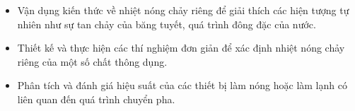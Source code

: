 \begin{emcothe}
\begin{itemize}
    \item Vận dụng kiến thức về nhiệt nóng chảy riêng để giải thích các hiện tượng tự nhiên như sự tan chảy của băng tuyết, quá trình đông đặc của nước.
    \item Thiết kế và thực hiện các thí nghiệm đơn giản để xác định nhiệt nóng chảy riêng của một số chất thông dụng.
    \item Phân tích và đánh giá hiệu suất của các thiết bị làm nóng hoặc làm lạnh có liên quan đến quá trình chuyển pha.
\end{itemize}
\end{emcothe}
